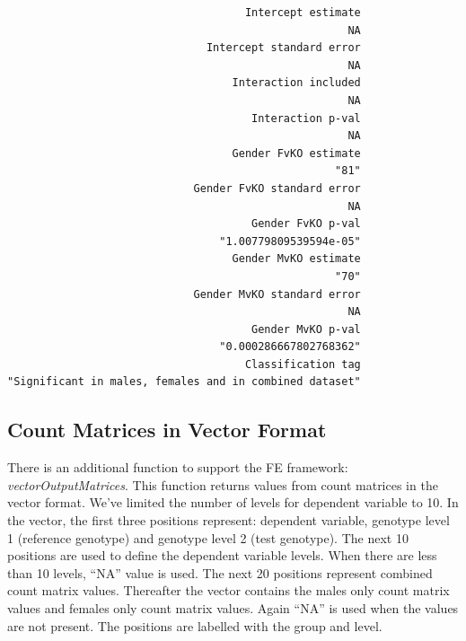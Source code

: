 \documentclass[12pt,a4paper]{article}
\begin{document}
\begin{verbatim}
                                     Intercept estimate 
                                                     NA 
                               Intercept standard error 
                                                     NA 
                                   Interaction included 
                                                     NA 
                                      Interaction p-val 
                                                     NA 
                                   Gender FvKO estimate 
                                                   "81" 
                             Gender FvKO standard error 
                                                     NA 
                                      Gender FvKO p-val 
                                 "1.00779809539594e-05" 
                                   Gender MvKO estimate 
                                                   "70" 
                             Gender MvKO standard error 
                                                     NA 
                                      Gender MvKO p-val 
                                 "0.000286667802768362" 
                                     Classification tag 
"Significant in males, females and in combined dataset"
\end{verbatim}
\endgroup

\subsection{Count Matrices in Vector Format}
There is an additional function to support the FE framework: \textit{vectorOutputMatrices}. This function returns values from count matrices in the vector format.
We've limited the number of levels for dependent variable to 10. 
In the vector, the first three positions represent: dependent variable, genotype level 1 (reference genotype) and genotype level 2 (test genotype).
The next 10 positions are used to define the dependent variable levels. When there are less than 10 levels, ``NA'' value is used.
The next 20 positions represent combined count matrix values. Thereafter the vector contains the males only count matrix values and females only count matrix values. Again ``NA'' is used when the values are not present. The positions are labelled with the group and level.
\end{document}

